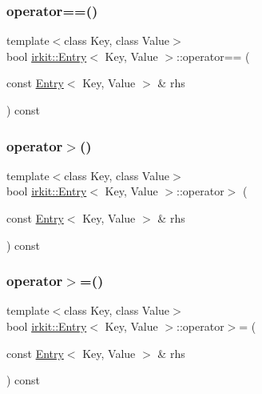 \mbox{\label{structirkit_1_1Entry_aaa12df0ae7e66638a6f0e5ddb552167b}} 
\subsubsection{\texorpdfstring{operator==()}{operator==()}}
{\footnotesize\ttfamily template$<$class Key, class Value$>$ \\
bool \mbox{\hyperlink{structirkit_1_1Entry}{irkit\+::\+Entry}}$<$ Key, Value $>$\+::operator== (\begin{DoxyParamCaption}\item[{const \mbox{\hyperlink{structirkit_1_1Entry}{Entry}}$<$ Key, Value $>$ \&}]{rhs }\end{DoxyParamCaption}) const\hspace{0.3cm}{\ttfamily [inline]}}

\mbox{\label{structirkit_1_1Entry_a0c421723ffe0eb3c56d1efc16f5f2fe5}} 
\subsubsection{\texorpdfstring{operator$>$()}{operator>()}}
{\footnotesize\ttfamily template$<$class Key, class Value$>$ \\
bool \mbox{\hyperlink{structirkit_1_1Entry}{irkit\+::\+Entry}}$<$ Key, Value $>$\+::operator$>$ (\begin{DoxyParamCaption}\item[{const \mbox{\hyperlink{structirkit_1_1Entry}{Entry}}$<$ Key, Value $>$ \&}]{rhs }\end{DoxyParamCaption}) const\hspace{0.3cm}{\ttfamily [inline]}}

\mbox{\label{structirkit_1_1Entry_a672de7d54aa88d29475e8664422a8e4f}} 
\subsubsection{\texorpdfstring{operator$>$=()}{operator>=()}}
{\footnotesize\ttfamily template$<$class Key, class Value$>$ \\
bool \mbox{\hyperlink{structirkit_1_1Entry}{irkit\+::\+Entry}}$<$ Key, Value $>$\+::operator$>$= (\begin{DoxyParamCaption}\item[{const \mbox{\hyperlink{structirkit_1_1Entry}{Entry}}$<$ Key, Value $>$ \&}]{rhs }\end{DoxyParamCaption}) const\hspace{0.3cm}{\ttfamily [inline]}}



